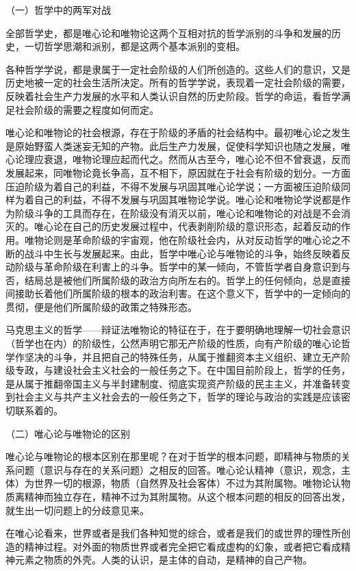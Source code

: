 \documentclass[UTF8, 12pt, a4paper]{ctexrep}
\begin{document}
（一）哲学中的两军对战

全部哲学史，都是唯心论和唯物论这两个互相对抗的哲学派别的斗争和发展的历史，一切哲学思潮和派别，都是这两个基本派别的变相。

各种哲学学说，都是隶属于一定社会阶级的人们所创造的。这些人们的意识，又是历史地被一定的社会生活所决定。所有的哲学学说，表现着一定社会阶级的需要，反映着社会生产力发展的水平和人类认识自然的历史阶段。哲学的命运，看哲学满足社会阶级的需要之程度如何而定。

唯心论和唯物论的社会根源，存在于阶级的矛盾的社会结构中。最初唯心论之发生是原始野蛮人类迷妄无知的产物。此后生产力发展，促使科学知识也随之发展，唯心论理应衰退，唯物论理应起而代之。然而从古至今，唯心论不但不曾衰退，反而发展起来，同唯物论竟长争高，互不相下，原因就在于社会有阶级的划分。一方面压迫阶级为着自己的利益，不得不发展与巩固其唯心论学说；一方面被压迫阶级同样为着自己的利益，不得不发展与巩固其唯物论学说。唯心论和唯物论学说都是作为阶级斗争的工具而存在，在阶级没有消灭以前，唯心论和唯物论的对战是不会消灭的。唯心论在自己的历史发展过程中，代表剥削阶级的意识形态，起着反动的作用。唯物论则是革命阶级的宇宙观，他在阶级社会内，从对反动哲学的唯心论之不断的战斗中生长与发展起来。由此，哲学中唯心论与唯物论的斗争，始终反映着反动阶级与革命阶级在利害上的斗争。哲学中的某一倾向，不管哲学者自身意识到与否，结局总是被他们所属阶级的政治方向所左右的。哲学上的任何倾向，总是直接间接助长着他们所属阶级的根本的政治利害。在这个意义下，哲学中的一定倾向的贯彻，便是他们所属阶级的政策之特殊形态。

马克思主义的哲学——辩证法唯物论的特征在于，在于要明确地理解一切社会意识（哲学也在内）的阶级性，公然声明它那无产阶级的性质，向有产阶级的唯心论哲学作坚决的斗争，并且把自己的特殊任务，从属于推翻资本主义组织、建立无产阶级专政，与建设社会主义社会的一般任务之下。在中国目前阶段上，哲学的任务，是从属于推翻帝国主义与半封建制度、彻底实现资产阶级的民主主义，并准备转变到社会主义与共产主义社会去的一般任务之下，哲学的理论与政治的实践是应该密切联系着的。

（二）唯心论与唯物论的区别

唯心论与唯物论的根本区别在那里呢？在对于哲学的根本问题，即精神与物质的关系问题（意识与存在的关系问题）之相反的回答。唯心论认精神（意识，观念，主体）为世界一切的根源，物质（自然界及社会客体）不过为其附属物。唯物论认物质离精神而独立存在，精神不过为其附属物。从这个根本问题的相反的回答出发，就生出一切问题上的分歧意见来。

在唯心论看来，世界或者是我们各种知觉的综合，或者是我们的或世界的理性所创造的精神过程。对外面的物质世界或者完全把它看成虚构的幻象，或者把它看成精神元素之物质的外壳。人类的认识，是主体的自动，是精神的自己产物。
\end{document}

